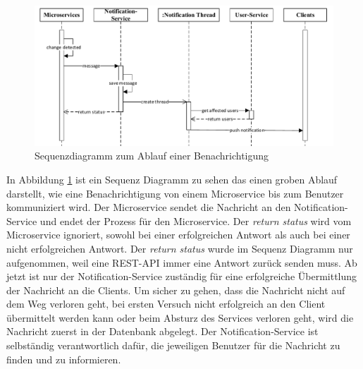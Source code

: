 \begin{figure}[H]
\centering
\includegraphics[width=\pictureWidth cm + 2 cm]{Bilder/Sequenz_Diagramm/Notification_Sequenz.pdf}
\caption{Sequenzdiagramm zum Ablauf einer Benachrichtigung\label{fig:notificationsequenz}\protect\footnotemark}
\end{figure}

In Abbildung \ref{fig:notificationsequenz} ist ein Sequenz Diagramm zu sehen das einen groben Ablauf darstellt, wie eine Benachrichtigung von einem Microservice bis zum Benutzer kommuniziert wird. Der Microservice sendet die Nachricht an den Notification-Service und endet der Prozess für den Microservice. Der \textit{return status} wird vom Microservice ignoriert, sowohl bei einer erfolgreichen Antwort als auch bei einer nicht erfolgreichen Antwort. Der \textit{return status} wurde im Sequenz Diagramm nur aufgenommen, weil eine \ac{REST}-\ac{API} immer eine Antwort zurück senden muss. Ab jetzt ist nur der Notification-Service zuständig für eine erfolgreiche Übermittlung der Nachricht an die Clients. Um sicher zu gehen, dass die Nachricht nicht auf dem Weg verloren geht, bei ersten Versuch nicht erfolgreich an den Client übermittelt werden kann oder beim Absturz des Services verloren geht, wird die Nachricht zuerst in der Datenbank abgelegt. Der Notification-Service ist selbständig verantwortlich dafür, die jeweiligen Benutzer für die Nachricht zu finden und zu informieren. 

